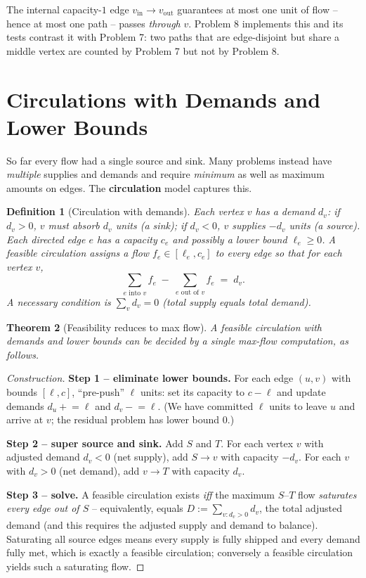 \documentclass[11pt]{article}
\newtheorem{theorem}{Theorem}[section]
\newtheorem{definition}[theorem]{Definition}
\begin{document}
The internal capacity-$1$ edge $v_{\text{in}} \to v_{\text{out}}$ guarantees at
most one unit of flow -- hence at most one path -- passes \emph{through} $v$.
Problem 8 implements this and its tests contrast it with Problem 7: two paths
that are edge-disjoint but share a middle vertex are counted by Problem 7 but not
by Problem 8.

\section{Circulations with Demands and Lower Bounds}

So far every flow had a single source and sink. Many problems instead have
\emph{multiple} supplies and demands and require \emph{minimum} as well as
maximum amounts on edges. The \textbf{circulation} model captures this.

\begin{definition}[Circulation with demands]
Each vertex $v$ has a \emph{demand} $d_v$: if $d_v > 0$, $v$ must \emph{absorb}
$d_v$ units (a sink); if $d_v < 0$, $v$ \emph{supplies} $-d_v$ units (a source).
Each directed edge $e$ has a capacity $c_e$ and possibly a \emph{lower bound}
$\ell_e \ge 0$. A \emph{feasible circulation} assigns a flow $f_e \in [\ell_e,
c_e]$ to every edge so that for each vertex $v$,
\[
   \sum_{e \text{ into } v} f_e \;-\; \sum_{e \text{ out of } v} f_e \;=\; d_v .
\]
A necessary condition is $\sum_v d_v = 0$ (total supply equals total demand).
\end{definition}

\begin{theorem}[Feasibility reduces to max flow]
\label{thm:circulation}
A feasible circulation with demands and lower bounds can be decided by a single
max-flow computation, as follows.
\end{theorem}

\begin{proof}[Construction]
\textbf{Step 1 -- eliminate lower bounds.} For each edge $(u,v)$ with bounds
$[\ell, c]$, ``pre-push'' $\ell$ units: set its capacity to $c - \ell$ and
update demands $d_u \mathrel{+}= \ell$ and $d_v \mathrel{-}= \ell$. (We have
committed $\ell$ units to leave $u$ and arrive at $v$; the residual problem has
lower bound $0$.)

\textbf{Step 2 -- super source and sink.} Add $S$ and $T$. For each vertex $v$
with adjusted demand $d_v < 0$ (net supply), add $S \to v$ with capacity $-d_v$.
For each $v$ with $d_v > 0$ (net demand), add $v \to T$ with capacity $d_v$.

\textbf{Step 3 -- solve.} A feasible circulation exists \emph{iff} the maximum
$S$--$T$ flow \emph{saturates every edge out of $S$} -- equivalently, equals
$D := \sum_{v: d_v > 0} d_v$, the total adjusted demand (and this requires the
adjusted supply and demand to balance). Saturating all source edges means every
supply is fully shipped and every demand fully met, which is exactly a feasible
circulation; conversely a feasible circulation yields such a saturating flow.
\end{proof}
\end{document}
